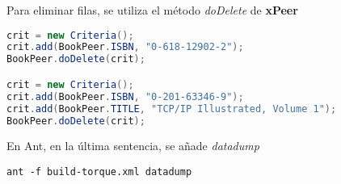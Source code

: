 Para eliminar filas, se utiliza el método {\em doDelete} de {\bf xPeer}

\begin{lstlisting}[language=Java]
crit = new Criteria();
crit.add(BookPeer.ISBN, "0-618-12902-2");
BookPeer.doDelete(crit);

crit = new Criteria();
crit.add(BookPeer.ISBN, "0-201-63346-9");
crit.add(BookPeer.TITLE, "TCP/IP Illustrated, Volume 1");
BookPeer.doDelete(crit);
\end{lstlisting}

En Ant, en la última sentencia, se añade {\em datadump} 

\begin{lstlisting}
ant -f build-torque.xml datadump
\end{lstlisting}